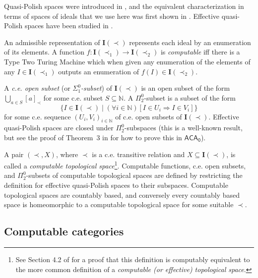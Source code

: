 \documentclass[envcountsame]{llncs}
\def\lsigma#1{{\Sigma}^0_{#1}}
\def\lpi#1{{\Pi}^0_{#1}}
\def\IN{{\mathbb N}}
\def\I#1{{{\mathrm{\mathbf I}}(#1)}}
\newcommand{\ACA}{\mathsf{ACA_0}}
\begin{document}
Quasi-Polish spaces were introduced in \cite{dbr}, and the equivalent characterization in terms of spaces of ideals that we use here was first shown in \cite{DPS}. Effective quasi-Polish spaces have been studied in \cite{Sel15,KK17,DPS,HRSS19,DKS24}.

An admissible representation \cite{Sch02} of $\I{\prec}$ represents each ideal by an enumeration of its elements. A function $f\colon \I{\prec_1} \to \I{\prec_2}$ is \emph{computable} iff there is a Type Two Turing Machine \cite{W00} which when given any enumeration of the elements of any $I\in \I{\prec_1}$ outputs an enumeration of $f(I) \in \I{\prec_2}$.

A \emph{c.e. open subset} (or \emph{$\lsigma 1$-subset}) of $\I{\prec}$ is an open subset of the form $\bigcup_{a\in S} [a]_{\prec}$ for some c.e. subset $S\subseteq \IN$. A $\lpi 2$-subset is a subset of the form
\[ \{ I \in \I{\prec} \mid (\forall i\in\IN)[ I \in U_i \Rightarrow I \in V_i]\}\]
for some c.e. sequence $(U_i, V_i)_{i\in\IN}$ of c.e. open subsets of $\I{\prec}$. Effective quasi-Polish spaces are closed under $\lpi 2$-subspaces (this is a well-known result, but see the proof of Theorem~3 in \cite{dbr20} for how to prove this in $\ACA$).

A pair $(\prec, X)$, where $\prec$ is a c.e. transitive relation and $X\subseteq \I{\prec}$,  is called a \emph{computable topological space}\footnote{See Section 4.2 of \cite{dbr20} for a proof that this definition is computably equivalent to the more common definition of a \emph{computable (or effective) topological space}.}. Computable functions, c.e. open subsets, and $\lpi 2$-subsets of computable topological spaces are defined by restricting the definition for effective quasi-Polish spaces to their subspaces. Computable topological spaces are countably based, and conversely every countably based space is homeomorphic to a computable topological space for some suitable $\prec$.


\subsection{Computable categories}
\end{document}
